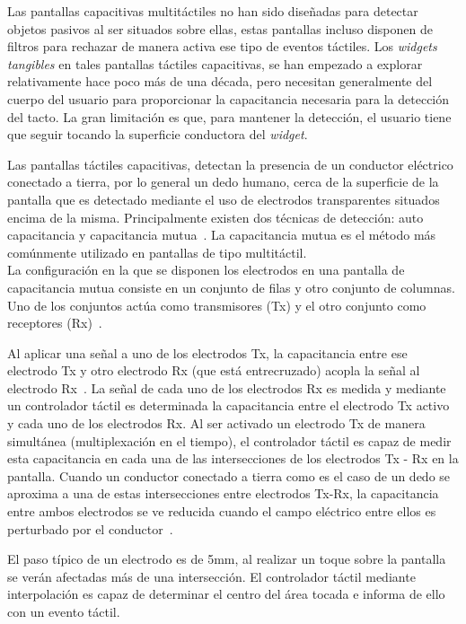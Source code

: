 Las pantallas capacitivas multitáctiles no han sido diseñadas para detectar objetos pasivos al ser situados sobre ellas, estas pantallas incluso disponen de filtros para rechazar de manera activa ese tipo de eventos táctiles.
Los \emph{widgets tangibles} en tales pantallas táctiles capacitivas, se han empezado a explorar relativamente hace poco más de una década\cite{Rekimoto}, pero necesitan generalmente del cuerpo del usuario para proporcionar la capacitancia necesaria para la detección del tacto. La gran limitación es que, para mantener la detección, el usuario tiene que seguir tocando la superficie conductora del \emph{widget}.

Las pantallas táctiles capacitivas, detectan la presencia de un conductor eléctrico conectado a tierra, por lo general un dedo humano, cerca de la superficie de la pantalla que es detectado mediante el uso de electrodos transparentes situados encima de la misma.
Principalmente existen dos técnicas de detección: auto capacitancia y capacitancia mutua~\cite{Barrett}. La capacitancia mutua es el método más comúnmente utilizado en pantallas de tipo multitáctil.\\

La configuración en la que se disponen los electrodos en una pantalla de capacitancia mutua consiste en un conjunto de filas y otro conjunto de columnas. Uno de los conjuntos actúa como transmisores (Tx) y el otro conjunto como receptores (Rx)~\cite{Rekimoto}.

Al aplicar una señal a uno de los electrodos Tx, la capacitancia entre ese electrodo Tx y otro electrodo Rx (que está entrecruzado) acopla la señal al electrodo Rx~\cite{Silicon}. La señal de cada uno de los electrodos Rx es medida y mediante un controlador táctil es determinada la capacitancia entre el electrodo Tx activo y cada uno de los electrodos Rx. Al ser activado un electrodo Tx de manera simultánea (multiplexación en el tiempo), el controlador táctil es capaz de medir esta capacitancia en cada una de las intersecciones de los electrodos Tx - Rx en la pantalla.
Cuando un conductor conectado a tierra como es el caso de un dedo se aproxima a una de estas intersecciones entre electrodos Tx-Rx, la capacitancia entre ambos electrodos se ve reducida cuando el campo eléctrico entre ellos es perturbado por el conductor~\cite{Zimmerman}.

El paso típico de un electrodo es de 5mm, al realizar un toque sobre la pantalla se verán afectadas más de una intersección. El controlador táctil mediante interpolación es capaz de determinar el centro del área tocada e informa de ello con un evento táctil.

